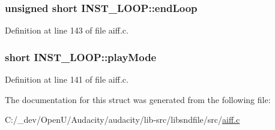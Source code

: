 \subsubsection[{\texorpdfstring{end\+Loop}{endLoop}}]{\setlength{\rightskip}{0pt plus 5cm}unsigned short I\+N\+S\+T\+\_\+\+L\+O\+O\+P\+::end\+Loop}\hypertarget{struct_i_n_s_t___l_o_o_p_ab6d8a9dfdd0c0d6ae14139aa918a509c}{}\label{struct_i_n_s_t___l_o_o_p_ab6d8a9dfdd0c0d6ae14139aa918a509c}


Definition at line 143 of file aiff.\+c.

\subsubsection[{\texorpdfstring{play\+Mode}{playMode}}]{\setlength{\rightskip}{0pt plus 5cm}short I\+N\+S\+T\+\_\+\+L\+O\+O\+P\+::play\+Mode}\hypertarget{struct_i_n_s_t___l_o_o_p_ae87d0ed027ed2a3cd884689366d79da2}{}\label{struct_i_n_s_t___l_o_o_p_ae87d0ed027ed2a3cd884689366d79da2}


Definition at line 141 of file aiff.\+c.



The documentation for this struct was generated from the following file\+:\begin{DoxyCompactItemize}
\item 
C\+:/\+\_\+dev/\+Open\+U/\+Audacity/audacity/lib-\/src/libsndfile/src/\hyperlink{aiff_8c}{aiff.\+c}\end{DoxyCompactItemize}
